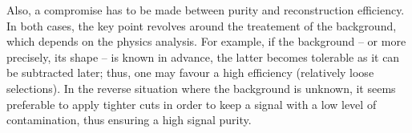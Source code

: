 Also, a compromise has to be made between purity and reconstruction efficiency. In both cases, the key point revolves around the treatement of the background, which depends on the physics analysis. For example, if the background -- or more precisely, its shape -- is known in advance, the latter becomes tolerable as it can be subtracted later; thus, one may favour a high efficiency (\ie relatively loose selections). In the reverse situation  where the background is unknown, it seems preferable to apply tighter cuts in order to keep a signal with a low level of contamination, thus ensuring a high signal purity.

